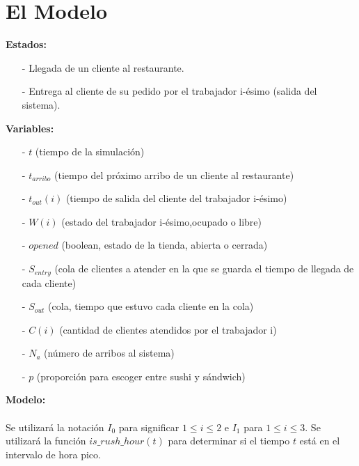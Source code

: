 \documentclass[11pt]{article}
\begin{document}
\section{El Modelo}
\textbf{\Large Estados:}
\begin{enumerate}
	\item [-] Llegada de un cliente al restaurante.
	\item [-] Entrega al cliente de su pedido por el trabajador i-\'esimo (salida del sistema).
\end{enumerate}
\textbf{\Large Variables:}
\begin{enumerate}
	\item [-] $t$ (tiempo de la simulaci\'on)
	\item [-] $t_{arribo}$ (tiempo del pr\'oximo arribo de un cliente al restaurante)
	\item [-] $t_{out}(i)$ (tiempo de salida del cliente del trabajador i-\'esimo)
	\item [-] $W(i)$ (estado del trabajador i-\'esimo,ocupado o libre)
	\item [-] $opened$ (boolean, estado de la tienda, abierta o cerrada)
	\item [-] $S_{entry}$ (cola de clientes a atender en la que se guarda el tiempo de llegada de cada cliente)
	\item [-] $S_{out}$ (cola, tiempo que estuvo cada cliente en la cola)
	\item [-] $C(i)$ (cantidad de clientes atendidos por el trabajador i)
	\item [-] $N_a$ (n\'umero de arribos al sistema)
	\item [-] $p$ (proporci\'on para escoger entre sushi y s\'andwich)
	\\
\end{enumerate}
\textbf{\Large Modelo:}\\\\
Se utilizar\'a la notaci\'on $I_0$ para significar $1\leq i \leq 2$ e $I_1$ para $1\leq i \leq 3$.
Se utilizar\'a la funci\'on $is\_rush\_hour(t)$ para determinar si el tiempo $t$ est\'a en el intervalo de hora pico.
\end{document}
